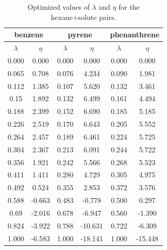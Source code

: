 \documentclass[
	12pt,				%
	openany,			%
	oneside,			%
	a4paper,			%
	english,			%
	brazil				%
	]{abntex2}
\providecommand{\DIFaddend}{}
\providecommand{\DIFaddend}{} %
\begin{document}
\DIFaddend \begin{table}[h]
	\centering
	\caption{Optimized values of $\lambda $ and $\eta $ for the hexane+solute pairs.}
	\label{tbl:lambdahex}
	\begin{tabular}{cccccc}
		\hline\hline
		\multicolumn{2}{c}{benzene}&\multicolumn{2}{c}{pyrene}& \multicolumn{2}{c}{phenanthrene}\\
		\hline\hline
		$\lambda$ & $\eta$& $\lambda$ & $\eta$  & $\lambda$ & $\eta$   \\ 
		\hline\hline
		0.000     &0.000      & 0.000    &    0.000    &    0.000    &    0.000    \\
		0.065     &0.708  & 0.076    &    4.234    &    0.090    &    1.981    \\
		0.112     &1.385  & 0.107    &    5.620    &    0.132    &    3.461    \\
		0.15      &1.892  & 0.132    &    6.499    &    0.161    &    4.494    \\
		0.188     &2.399  & 0.152    &    6.690    &    0.185    &    5.185    \\
		0.226     &2.519  & 0.170    &    6.643    &    0.205    &    5.552    \\
		0.264     &2.457  & 0.189    &    6.461    &    0.224    &    5.725    \\
		0.304     &2.367  & 0.213    &    6.091    &    0.244    &    5.722    \\
		0.356     &1.921  & 0.242    &    5.566    &    0.268    &    5.523    \\
		0.411     &1.411  & 0.280    &    4.729    &    0.305    &    4.975    \\
		0.492     &0.524  & 0.355    &    2.853    &    0.372    &    3.576    \\
		0.588     &-0.663 & 0.483    &    -0.778    &    0.500    &    0.297    \\
		0.69      &-2.016 & 0.678    &    -6.947    &    0.560    &    -1.390    \\
		0.824     &-3.922 & 0.788    &    -10.631    &    0.722    &    -6.309    \\
		1.000         &-6.583  &1.000      &    -18.141    &    1.000    &    -15.448    \\
		\hline\hline   
	\end{tabular}
\end{table}
\end{document}
